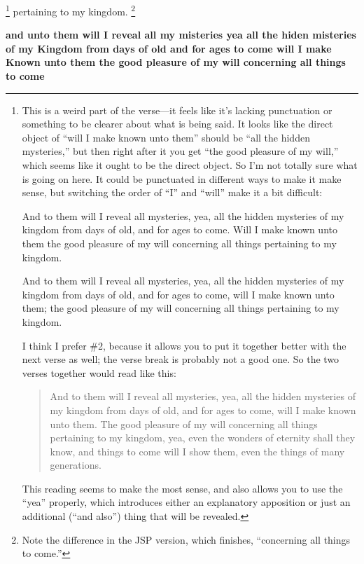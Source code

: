 			\footnote{%
				\label{DC76-7-will}%
				This is a weird part of the verse---it feels like it's lacking punctuation or something to be clearer about what is being said. It looks like the direct object of ``will I make known unto them'' should be ``all the hidden mysteries,'' but then right after it you get ``the good pleasure of my will,'' which seems like it ought to be the direct object. So I'm not totally sure what is going on here. It could be punctuated in different ways to make it make sense, but switching the order of ``I'' and ``will'' make it a bit difficult:
					\begin{compactitem}
						\item[\#1] And to them will I reveal all mysteries, yea, all the hidden mysteries of my kingdom from days of old, and for ages to come. Will I make known unto them the good pleasure of my will concerning all things pertaining to my kingdom.
						\item[\#2] And to them will I reveal all mysteries, yea, all the hidden mysteries of my kingdom from days of old, and for ages to come, will I make known unto them; the good pleasure of my will concerning all things pertaining to my kingdom.
					\end{compactitem}
				I think I prefer \#2, because it allows you to put it together better with the next verse as well; the verse break is probably not a good one. So the two verses together would read like this:
					\begin{quote}
						And to them will I reveal all mysteries, yea, all the hidden mysteries of my kingdom from days of old, and for ages to come, will I make known unto them. The good pleasure of my will concerning all things pertaining to my kingdom, yea, even the wonders of eternity shall they know, and things to come will I show them, even the things of many generations.
					\end{quote}
				This reading seems to make the most sense, and also allows you to use the ``yea'' properly, which introduces either an explanatory apposition or just an additional (``and also'') thing that will be revealed.
				}
		pertaining to my kingdom.%
			\footnote{%
				\label{DC76-7-kingdom}%
				Note the difference in the JSP version, which finishes, ``concerning all things to come.'' 
				}

		\begin{framed}
		\scriptsize
			\begin{compactdesc}
				\item[JSP] \textbf{and unto them will I reveal all my misteries yea all the hiden misteries of my Kingdom from days of old and for ages to come will I make Known unto them the good pleasure of my will concerning all things to come}
			\end{compactdesc}
		\end{framed}

